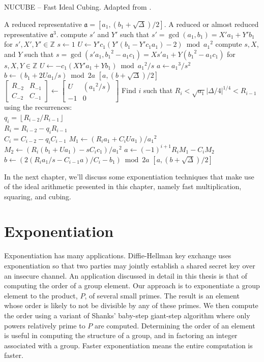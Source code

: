 \documentclass{ucalgthes1}
\theoremstyle{definition}
\newcommand{\ZZ}{\mathbb{Z}}
\newcommand{\matrixtt}[4]{\left[ \begin{array}{rr} #1 & #2 \\ #3 & #4 \end{array} \right]}
\newcommand{\floor}[1]{\left\lfloor #1 \right\rfloor}
\begin{document}
\begin{algorithm}[h]
\caption{NUCUBE -- Fast Ideal Cubing. Adapted from \cite[p.26]{Imbert2010}.}
\label{alg:nucube}
\begin{algorithmic}[1]
\REQUIRE A reduced representative $\mathfrak a = [a_1, (b_1+\sqrt\Delta)/2]$.
\ENSURE A reduced or almost reduced representative $\mathfrak a^3$.
\STATE compute $s'$ and $Y'$ such that $s' = \gcd(a_1, b_1) = X'a_1 + Y'b_1$ for $s', X', Y' \in \ZZ$
	\STATE $s \gets 1$
	\STATE $U \gets Y'c_1(Y'(b_1 - Y'c_1a_1) - 2) \bmod {a_1}^2$
\ELSE
	\STATE compute $s, X$, and $Y$ such that $s = \gcd(s'a_1, {b_1}^2 - a_1c_1) = Xs'a_1 + Y({b_1}^2 - a_1c_1)$ for $s, X, Y \in \ZZ$
	\STATE $U \gets -c_1(XY'a_1+Yb_1) \bmod {a_1}^2/s$
\ENDIF
{}
	\STATE $a \gets {a_1}^3/s^2$
	\STATE $b \gets (b_1 + 2Ua_1/s) \bmod 2a$
	\RETURN $[a, (b+\sqrt\Delta)/2]$
\ENDIF
\STATE $\matrixtt{R_{-2}}{R_{-1}}{C_{-2}}{C_{-1}} \gets \matrixtt{U}{({a_1}^2/s)}{-1}{0}$
\STATE Find $i$ such that $R_i < \sqrt{a_1} |\Delta/4|^{1/4} < R_{i-1}$ using the recurrences: \\
       $q_i = \floor{R_{i-2}/R_{i-1}}$ \\
       $R_i = R_{i-2}-q_i R_{i-1}$ \\
       $C_i=C_{i-2}-q_i C_{i-1}$
\STATE $M_1 \gets (R_ia_1 + C_iUa_1) / {a_1}^2$
\STATE $M_2 \gets (R_i(b_1 + Ua_1) - sC_ic_1) / {a_1}^2$
\STATE $a \gets (-1)^{i+1} R_i M_1 - C_i M_2$
\STATE $b \gets (2(R_ia_1/s - C_{i-1}a)/C_i - b_1) \bmod 2a$
\RETURN $[a, (b+\sqrt\Delta)/2]$
\end{algorithmic}
\end{algorithm}

In the next chapter, we'll discuss some exponentiation techniques that make use of the ideal arithmetic presented in this chapter, namely fast multiplication, squaring, and cubing.


\chapter{Exponentiation}
\label{chap:exponentiation}

Exponentiation has many applications. Diffie-Hellman key exchange uses exponentiation so that two parties may jointly establish a shared secret key over an insecure channel.  An application discussed in detail in this thesis is that of computing the order of a group element.  Our approach is to exponentiate a group element to the product, $P$, of several small primes.  The result is an element whose order is likely to not be divisible by any of these primes. We then compute the order using a variant of Shanks' baby-step giant-step algorithm where only powers relatively prime to $P$ are computed.  Determining the order of an element is useful in computing the structure of a group, and in factoring an integer associated with a group.  Faster exponentiation means the entire computation is faster.
\end{document}
